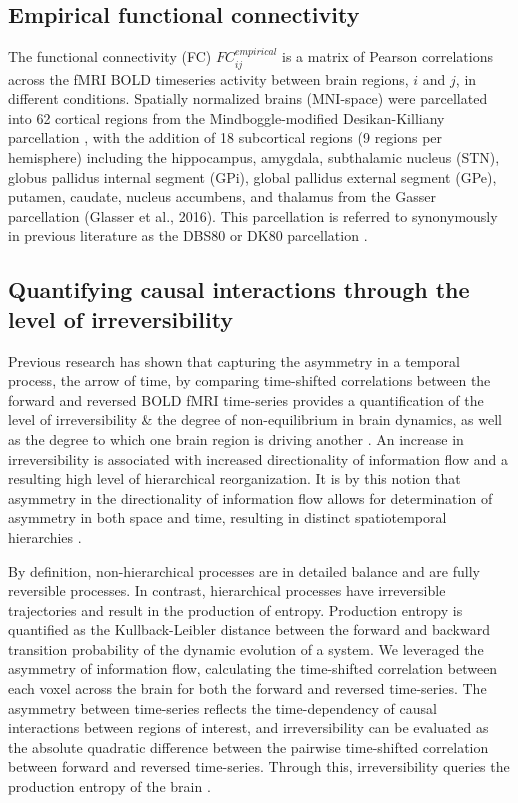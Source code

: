 \subsection{Empirical functional connectivity}
The functional connectivity (FC)
$FC_{ij}^{empirical}$ is a matrix of Pearson correlations across the
fMRI BOLD timeseries activity between brain regions, \(i\) and \(j\), in
different conditions. Spatially normalized brains (MNI-space) were
parcellated into 62 cortical regions from the Mindboggle-modified
Desikan-Killiany parcellation \parencite{Desikan2006,Klein2012}, with the addition
of 18 subcortical regions (9 regions per hemisphere) including the
hippocampus, amygdala, subthalamic nucleus (STN), globus pallidus
internal segment (GPi), global pallidus external segment (GPe), putamen,
caudate, nucleus accumbens, and thalamus from the Gasser parcellation
(Glasser et al., 2016). This parcellation is referred to synonymously in
previous literature as the DBS80 or DK80 parcellation \parencite{Capouskova2022,Deco2021,Desikan2006,Gomes2020,Klein2012,Kringelbach2023}.

\subsection{Quantifying causal interactions through the level of
irreversibility} 

Previous research has shown that capturing the asymmetry
in a temporal process, the arrow of time, by comparing time-shifted
correlations between the forward and reversed BOLD fMRI time-series
provides a quantification of the level of irreversibility \& the degree
of non-equilibrium in brain dynamics, as well as the degree to which one
brain region is driving another \parencite{Deco2022,Kringelbach2023}. An increase in irreversibility is associated with increased
directionality of information flow and a resulting high level of
hierarchical reorganization. It is by this
notion that asymmetry in the directionality of information flow allows
for determination of asymmetry in both space and time, resulting in
distinct spatiotemporal hierarchies \parencite{Deco2019,Golesorkhi2021,Kobeleva2021}.

By definition, non-hierarchical processes are in detailed balance and
are fully reversible processes. In contrast, hierarchical processes have
irreversible trajectories and result in the production of entropy.
Production entropy is quantified as the Kullback-Leibler distance
between the forward and backward transition probability of the dynamic
evolution of a system. We leveraged the asymmetry of information flow,
calculating the time-shifted correlation between each voxel across the
brain for both the forward and reversed time-series.  The asymmetry
between time-series reflects the time-dependency of causal
interactions between regions of interest, and irreversibility can be
evaluated as the absolute quadratic difference between the pairwise
time-shifted correlation between forward and reversed time-series. Through this, irreversibility queries the production entropy of the
brain \parencite{Lynn2021,SanzPerl2021}.

